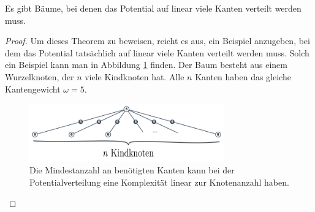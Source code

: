 \begin{theorem}\label{theorem_pot_auf_linear_vielen_kanten}
	Es gibt Bäume, bei denen das Potential auf linear viele Kanten verteilt werden muss.
\end{theorem}	
\begin{proof}
	Um dieses Theorem zu beweisen, reicht es aus, ein Beispiel anzugeben, bei dem das Potential tatsächlich auf linear viele Kanten verteilt werden muss. Solch ein Beispiel kann man in Abbildung \ref{abb_bsp_potverteilen} finden. Der Baum besteht aus einem Wurzelknoten, der $n$ viele Kindknoten hat. Alle $n$ Kanten haben das gleiche Kantengewicht $\omega = 5$.
	
		\begin{figure}[htb]
			\includegraphics[width=0.75\textwidth]{bilder/abb_bsp_potverteilen.png} 
			\captionsetup{width=0.75\textwidth}
			\caption{Die Mindestanzahl an benötigten Kanten kann bei der Potentialverteilung eine Komplexität linear zur Knotenanzahl haben.}
			\label{abb_bsp_potverteilen}
		\end{figure}
		

\end{proof}
